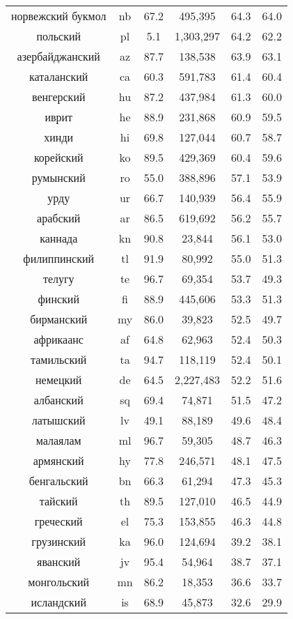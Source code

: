 {\begin{table*}
{\begin{tabular}{|c|c|c||c|c|c|}
норвежский букмол & nb & 67.2 & 495,395 & 64.3 & 64.0\\
польский & pl & 5.1 & 1,303,297 & 64.2 & 62.2\\
азербайджанский & az & 87.7 & 138,538 & 63.9 & 63.1\\
каталанский & ca & 60.3 & 591,783 & 61.4 & 60.4\\
венгерский & hu & 87.2 & 437,984 & 61.3 & 60.0\\
иврит & he & 88.9 & 231,868 & 60.9 & 59.5\\
хинди & hi & 69.8 & 127,044 & 60.7 & 58.7\\
корейский & ko & 89.5 & 429,369 & 60.4 & 59.6\\
румынский & ro & 55.0 & 388,896 & 57.1 & 53.9\\
урду & ur & 66.7 & 140,939 & 56.4 & 55.9\\
арабский & ar & 86.5 & 619,692 & 56.2 & 55.7\\
каннада & kn & 90.8 & 23,844 & 56.1 & 53.0\\
филиппинский & tl & 91.9 & 80,992 & 55.0 & 51.3\\
телугу & te & 96.7 & 69,354 & 53.7 & 49.3\\
финский & fi & 88.9 & 445,606 & 53.3 & 51.3\\
бирманский & my & 86.0 & 39,823 & 52.5 & 49.7\\
африкаанс & af & 64.8 & 62,963 & 52.4 & 50.3\\
тамильский & ta & 94.7 & 118,119 & 52.4 & 50.1\\
немецкий & de & 64.5 & 2,227,483 & 52.2 & 51.6\\
албанский & sq & 69.4 & 74,871 & 51.5 & 47.2\\
латышский & lv & 49.1 & 88,189 & 49.6 & 48.4\\
малаялам & ml & 96.7 & 59,305 & 48.7 & 46.3\\
армянский & hy & 77.8 & 246,571 & 48.1 & 47.5\\
бенгальский & bn & 66.3 & 61,294 & 47.3 & 45.3\\
тайский & th & 89.5 & 127,010 & 46.5 & 44.9\\
греческий & el & 75.3 & 153,855 & 46.3 & 44.8\\
грузинский & ka & 96.0 & 124,694 & 39.2 & 38.1\\
яванский & jv & 95.4 & 54,964 & 38.7 & 37.1\\
монгольский & mn & 86.2 & 18,353 & 36.6 & 33.7\\
исландский & is & 68.9 & 45,873 & 32.6 & 29.9\\

\end{tabular}}
\end{table*}}
